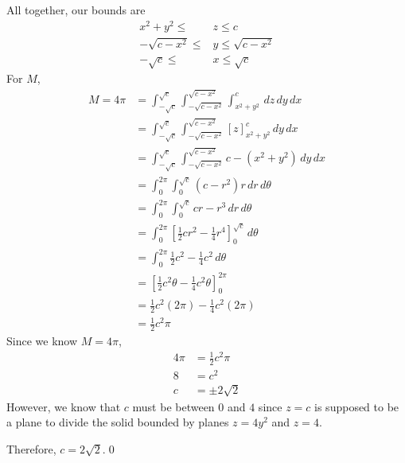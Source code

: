 \documentclass{article}
\newcommand{\lrb}[1]{\left[ #1 \right]}
\begin{document}
All together, our bounds are
\begin{align*}
    x^2+y^2\leq &z \leq c\\
    -\sqrt{c-x^2}\leq &y\leq \sqrt{c-x^2}\\
    -\sqrt{c}\leq &x\leq\sqrt{c}
\end{align*}
For $M$,
\begin{align*}
    M=4\pi&=\int_{-\sqrt{c}}^{\sqrt{c}}\int_{-\sqrt{c-x^2}}^{\sqrt{c-x^2}}\int_{x^2+y^2}^c\,dz\,dy\,dx\\
    &=\int_{-\sqrt{c}}^{\sqrt{c}}\int_{-\sqrt{c-x^2}}^{\sqrt{c-x^2}}\lrb{z}_{x^2+y^2}^c\,dy\,dx\\
    &=\int_{-\sqrt{c}}^{\sqrt{c}}\int_{-\sqrt{c-x^2}}^{\sqrt{c-x^2}} c-(x^2+y^2)\,dy\,dx\\
    &=\int_0^{2\pi}\int_0^{\sqrt{c}} (c-r^2)r\,dr\,d\theta\tag{let's convert to polar}\\
    &=\int_0^{2\pi}\int_0^{\sqrt{c}} cr-r^3\,dr\,d\theta\\
    &=\int_0^{2\pi}\lrb{\frac{1}{2}cr^2-\frac{1}{4}r^4}_0^{\sqrt{c}}\,d\theta\\
    &=\int_0^{2\pi} \frac{1}{2}c^2-\frac{1}{4}c^2\,d\theta\\
    &=\lrb{\frac{1}{2}c^2\theta-\frac{1}{4}c^2\theta}_0^{2\pi}\\
    &=\frac{1}{2}c^2(2\pi)-\frac{1}{4}c^2(2\pi)\\
    &=\frac{1}{2}c^2\pi
\end{align*}
Since we know $M=4\pi$,
\begin{align*}
    4\pi&=\frac{1}{2}c^2\pi\\
    8&=c^2\\
    c&=\pm 2\sqrt{2}
\end{align*}
However, we know that $c$ must be between $0$ and $4$ since $z=c$ is supposed to be a plane to divide the solid bounded by planes $z=4y^2$ and $z=4$.

Therefore, $c=2\sqrt{2}$.\qed
\end{document}
